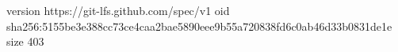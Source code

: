 version https://git-lfs.github.com/spec/v1
oid sha256:5155be3e388cc73ce4caa2bae5890eee9b55a720838fd6c0ab46d33b0831de1e
size 403
